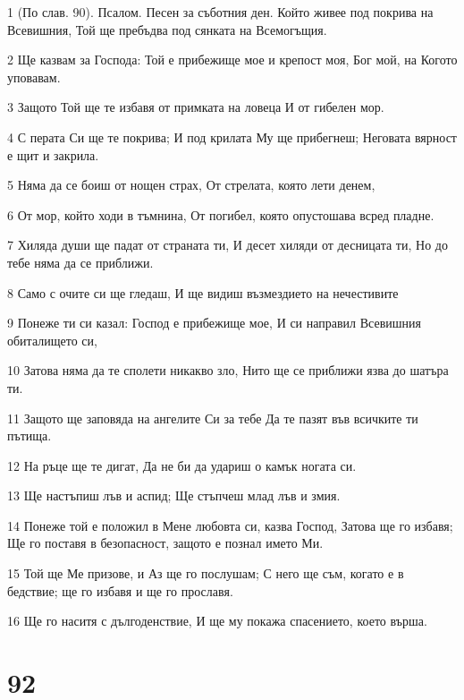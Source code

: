 \par 1 (По слав. 90). Псалом. Песен за съботния ден. Който живее под покрива на Всевишния, Той ще пребъдва под сянката на Всемогъщия.
\par 2 Ще казвам за Господа: Той е прибежище мое и крепост моя, Бог мой, на Когото уповавам.
\par 3 Защото Той ще те избавя от примката на ловеца И от гибелен мор.
\par 4 С перата Си ще те покрива; И под крилата Му ще прибегнеш; Неговата вярност е щит и закрила.
\par 5 Няма да се боиш от нощен страх, От стрелата, която лети денем,
\par 6 От мор, който ходи в тъмнина, От погибел, която опустошава всред пладне.
\par 7 Хиляда души ще падат от страната ти, И десет хиляди от десницата ти, Но до тебе няма да се приближи.
\par 8 Само с очите си ще гледаш, И ще видиш възмездието на нечестивите
\par 9 Понеже ти си казал: Господ е прибежище мое, И си направил Всевишния обиталището си,
\par 10 Затова няма да те сполети никакво зло, Нито ще се приближи язва до шатъра ти.
\par 11 Защото ще заповяда на ангелите Си за тебе Да те пазят във всичките ти пътища.
\par 12 На ръце ще те дигат, Да не би да удариш о камък ногата си.
\par 13 Ще настъпиш лъв и аспид; Ще стъпчеш млад лъв и змия.
\par 14 Понеже той е положил в Мене любовта си, казва Господ, Затова ще го избавя; Ще го поставя в безопасност, защото е познал името Ми.
\par 15 Той ще Ме призове, и Аз ще го послушам; С него ще съм, когато е в бедствие; ще го избавя и ще го прославя.
\par 16 Ще го наситя с дългоденствие, И ще му покажа спасението, което върша.

\chapter{92}

